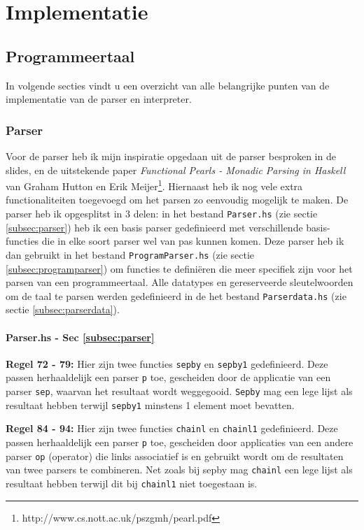 \documentclass[12pt, titlepage]{article}
\begin{document}
\newpage
\section{Implementatie}
\label{sec:implementatie}
\subsection{Programmeertaal}
In volgende secties vindt u een overzicht van alle belangrijke punten van de implementatie van de parser en interpreter.

\subsubsection{Parser}
Voor de parser heb ik mijn inspiratie opgedaan uit de parser besproken in de slides, en de uitstekende paper \textit{Functional Pearls - Monadic Parsing in Haskell} van Graham Hutton en Erik Meijer\footnote{http://www.cs.nott.ac.uk/pszgmh/pearl.pdf}. Hiernaast heb ik nog vele extra functionaliteiten toegevoegd om het parsen zo eenvoudig mogelijk te maken.
\newline
\newline
De parser heb ik opgesplitst in 3 delen: in het bestand \texttt{Parser.hs} (zie sectie \ref{subsec:parser}) heb ik een basis parser gedefinieerd met verschillende basis-functies die in elke soort parser wel van pas kunnen komen. Deze parser heb ik dan gebruikt in het bestand \texttt{ProgramParser.hs} (zie sectie \ref{subsec:programparser}) om functies te definiëren die meer specifiek zijn voor het parsen van een programmeertaal. Alle datatypes en gereserveerde sleutelwoorden om de taal te parsen werden gedefinieerd in de het bestand \texttt{Parserdata.hs} (zie sectie \ref{subsec:parserdata}).

\paragraph{Parser.hs - Sec \ref{subsec:parser}}
\begin{description}

\item{\bf Regel 72 - 79:} Hier zijn twee functies \texttt{sepby} en \texttt{sepby1} gedefinieerd. Deze passen herhaaldelijk een parser \texttt{p} toe, gescheiden door de applicatie van een parser \texttt{sep}, waarvan het resultaat wordt weggegooid. \texttt{Sepby} mag een lege lijst als resultaat hebben terwijl \texttt{sepby1} minstens 1 element moet bevatten.
\newline
\item{\bf Regel 84 - 94:} Hier zijn twee functies \texttt{chainl} en \texttt{chainl1} gedefinieerd. Deze passen herhaaldelijk een parser \texttt{p} toe, gescheiden door applicaties van een andere parser \texttt{op} (operator) die links associatief is en gebruikt wordt om de resultaten van twee parsers te combineren. Net zoals bij sepby mag \texttt{chainl} een lege lijst als resultaat hebben terwijl dit bij \texttt{chainl1} niet toegestaan is.
\end{description}
\end{document}
